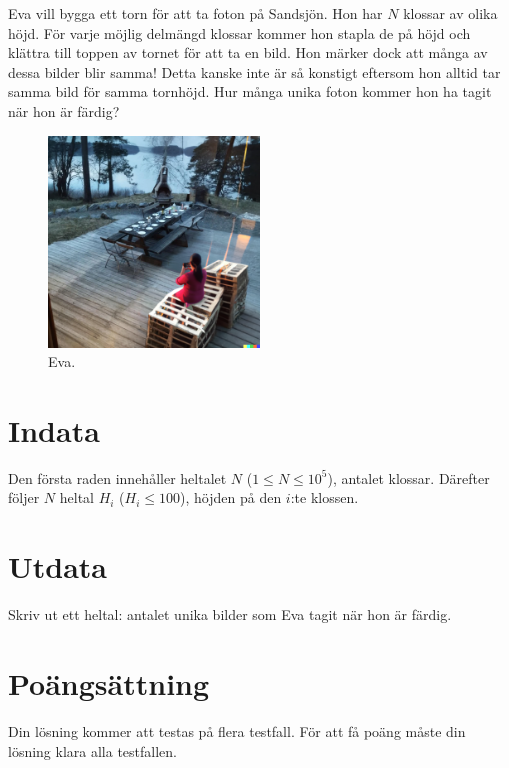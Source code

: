 Eva vill bygga ett torn för att ta foton på Sandsjön. Hon har $N$ klossar av olika höjd.
För varje möjlig delmängd klossar kommer hon stapla de på höjd och klättra till toppen av tornet
för att ta en bild. Hon märker dock att många av dessa bilder blir samma! Detta kanske inte är så konstigt eftersom hon alltid tar samma bild för samma tornhöjd. Hur många unika foton kommer hon ha tagit när hon är färdig? 

\begin{figure}
  \centering
    \includegraphics[width=0.5\textwidth]{eva.png}
  \caption{Eva.}
\end{figure}

\section*{Indata}
Den första raden innehåller heltalet $N$ ($1 \leq N \leq 10^5$), antalet klossar.
Därefter följer $N$ heltal $H_i$ ($H_i \leq 100$), höjden på den $i$:te klossen.
\section*{Utdata}
Skriv ut ett heltal: antalet unika bilder som Eva tagit när hon är färdig.

\section*{Poängsättning}
Din lösning kommer att testas på flera testfall.
För att få poäng måste din lösning klara alla testfallen.
